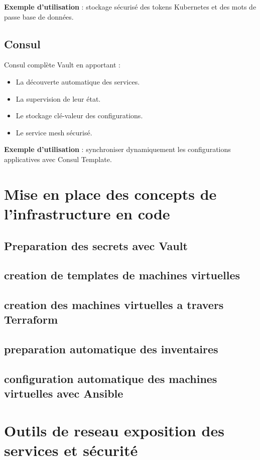 \textbf{Exemple d’utilisation} : stockage sécurisé des tokens Kubernetes et des mots de passe base de données.

\subsection{Consul}

Consul complète Vault en apportant :
\begin{itemize}
    \item La découverte automatique des services.
    \item La supervision de leur état.
    \item Le stockage clé-valeur des configurations.
    \item Le service mesh sécurisé.
\end{itemize}

\textbf{Exemple d’utilisation} : synchroniser dynamiquement les configurations applicatives avec Consul Template.

\section{Mise en place des concepts de l'infrastructure en code}
\subsection{Preparation des secrets avec Vault}
\subsection{creation de templates de machines virtuelles}
\subsection{creation des machines virtuelles a travers Terraform}
\subsection{preparation automatique des inventaires}
\subsection{configuration automatique des machines virtuelles avec Ansible}
\section{Outils de reseau exposition des services et sécurité}

